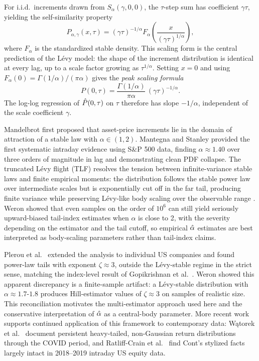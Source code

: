 \documentclass[conference]{IEEEtran}
\begin{document}
For i.i.d.\ increments drawn from $S_\alpha(\gamma,0,0)$, the $\tau$-step sum
has coefficient $\gamma\tau$, yielding the self-similarity property
\begin{equation}
  P_{\alpha,\gamma}(x,\tau)
  = (\gamma\tau)^{-1/\alpha}
    F_\alpha\!\left(\frac{x}{(\gamma\tau)^{1/\alpha}}\right),
  \label{eq:scaling}
\end{equation}
where $F_\alpha$ is the standardized stable density. This scaling form is the
central prediction of the Lévy model: the shape of the increment distribution
is identical at every lag, up to a scale factor growing as $\tau^{1/\alpha}$.
Setting $x=0$ and using $F_\alpha(0) = \Gamma(1/\alpha)/(\pi\alpha)$ gives the
\textit{peak scaling formula}
\begin{equation}
  P(0,\tau)
  = \frac{\Gamma(1/\alpha)}{\pi\alpha}\,(\gamma\tau)^{-1/\alpha}.
  \label{eq:peak}
\end{equation}
The log-log regression of $\hat{P}(0,\tau)$ on $\tau$ therefore has slope
$-1/\alpha$, independent of the scale coefficient $\gamma$.

Mandelbrot \cite{Mandelbrot1963} first proposed that asset-price increments lie in
the domain of attraction of a stable law with $\alpha\in(1,2)$.
Mantegna and Stanley \cite{MantegnaStanley1994,MantegnaStanley1995} provided the first
systematic intraday evidence using S\&P 500 data, finding $\alpha\approx 1.40$
over three orders of magnitude in lag and demonstrating clean PDF collapse.
The truncated Lévy flight (TLF) resolves the tension between
infinite-variance stable laws and finite empirical moments: the distribution
follows the stable power law over intermediate scales but is exponentially
cut off in the far tail, producing finite variance while preserving
Lévy-like body scaling over the observable range
\cite{MantegnaStanley1994,BouchaudPotters2003}. Weron \cite{Weron2001}
showed that even samples on the order of $10^6$ can still yield seriously
upward-biased tail-index estimates when $\alpha$ is close to 2, with the
severity depending on the estimator and the tail cutoff, so empirical
$\hat{\alpha}$ estimates are best interpreted as body-scaling parameters rather
than tail-index claims.

Plerou et al.\ \cite{Plerou1999} extended the analysis to individual US
companies and found power-law tails with exponent $\zeta\approx 3$, outside
the Lévy-stable regime in the strict sense, matching the index-level result
of Gopikrishnan et al.\ \cite{Gopikrishnan1999}. Weron \cite{Weron2001} showed this apparent
discrepancy is a finite-sample artifact: a Lévy-stable distribution with
$\alpha\approx 1.7$-$1.8$ produces Hill-estimator values of $\zeta\approx 3$
on samples of realistic size. This reconciliation motivates the
multi-estimator approach used here and the conservative
interpretation of $\hat{\alpha}$ as a central-body parameter. More recent work
supports continued application of this framework to contemporary data:
W{\k{a}}torek et al.\ \cite{Masoliver2021} document persistent heavy-tailed,
non-Gaussian return distributions through the COVID period, and Ratliff-Crain
et al.\ \cite{ContMiami2023} find Cont's stylized facts largely intact in
2018--2019 intraday US equity data.
\end{document}
